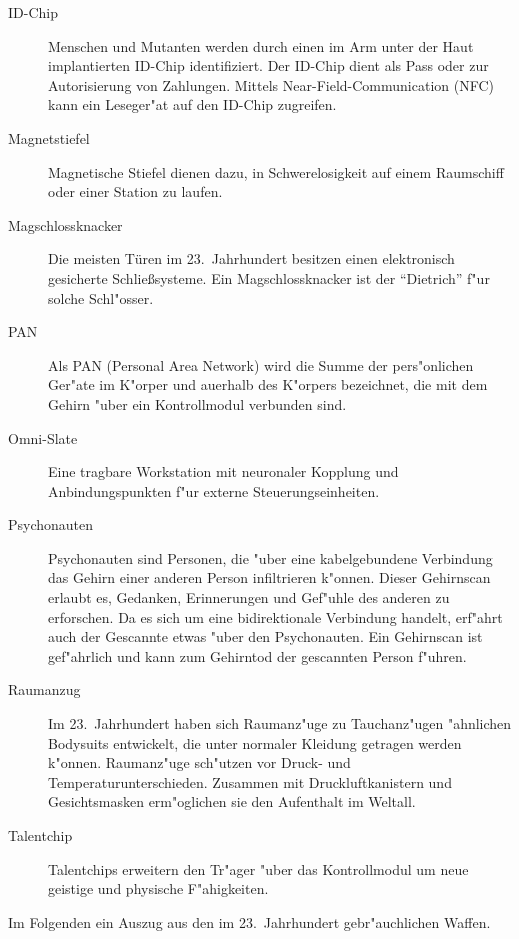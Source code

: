 \begin{description}
\item [ID-Chip] Menschen und Mutanten werden durch einen im Arm unter der Haut implantierten ID-Chip identifiziert. Der ID-Chip dient 
      als Pass oder zur Autorisierung von Zahlungen. Mittels Near-Field-Communication (NFC) kann ein Leseger"at auf den ID-Chip zugreifen.
\item [Magnetstiefel] Magnetische Stiefel dienen dazu, in Schwerelosigkeit auf einem Raumschiff oder einer Station zu laufen.
\item [Magschlossknacker] Die meisten Türen im 23.~Jahrhundert besitzen einen elektronisch gesicherte Schließsysteme. Ein 
      Magschlossknacker ist der ``Dietrich'' f"ur solche Schl"osser.
\item [PAN] Als PAN (Personal Area Network) wird die Summe der pers"onlichen Ger"ate im K"orper und au\3erhalb des K"orpers bezeichnet, 
      die mit dem Gehirn "uber ein Kontrollmodul verbunden sind.
\item [Omni-Slate] Eine tragbare Workstation mit neuronaler Kopplung und Anbindungspunkten f"ur externe Steuerungseinheiten.
\item [Psychonauten] Psychonauten sind Personen, die "uber eine kabelgebundene Verbindung das Gehirn einer anderen Person infiltrieren 
      k"onnen. Dieser Gehirnscan erlaubt es, Gedanken, Erinnerungen und Gef"uhle des anderen zu erforschen. Da es sich um eine bidirektionale Verbindung handelt, erf"ahrt auch der Gescannte etwas "uber den Psychonauten. Ein Gehirnscan ist gef"ahrlich und kann zum Gehirntod der gescannten Person f"uhren.
\item [Raumanzug] Im 23.~Jahrhundert haben sich Raumanz"uge zu Tauchanz"ugen "ahnlichen Bodysuits entwickelt, die unter normaler 
      Kleidung getragen werden k"onnen. Raumanz"uge sch"utzen vor Druck- und Temperaturunterschieden. Zusammen mit Druckluftkanistern und Gesichtsmasken erm"oglichen sie den Aufenthalt im Weltall.
\item [Talentchip] Talentchips erweitern den Tr"ager "uber das Kontrollmodul um neue geistige und physische F"ahigkeiten.
\end{description}

Im Folgenden ein Auszug aus den im 23.~Jahrhundert gebr"auchlichen Waffen.

